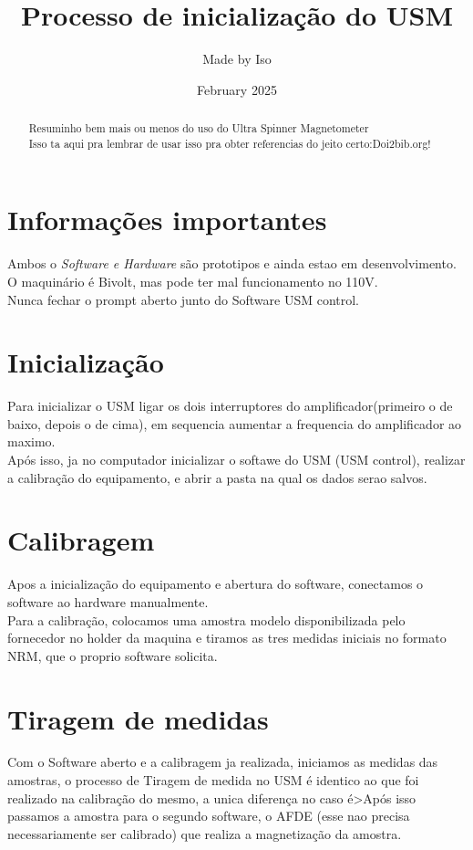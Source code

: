 \documentclass[twocolumn]{paper}
\title{Processo de inicialização do USM}
\author{Made by Iso }
\date{February 2025}
\begin{document}
\maketitle

\begin{abstract}
  Resuminho bem mais ou menos do uso do Ultra Spinner Magnetometer\\
  Isso ta aqui pra lembrar de usar isso pra obter referencias do jeito certo:Doi2bib.org!
\end{abstract}

\section{Informações importantes}
Ambos o \emph{Software e Hardware} são prototipos e ainda estao em desenvolvimento.\\
O maquinário é Bivolt, mas pode ter mal funcionamento no 110V.\\
Nunca fechar o prompt aberto junto do Software USM control.\\

\section{Inicialização}
Para inicializar o USM ligar os dois interruptores do amplificador(primeiro o de baixo, depois o de cima), em sequencia aumentar a frequencia do amplificador ao maximo.\\
Após isso, ja no computador inicializar o softawe do USM (USM control), realizar a calibração do equipamento, e abrir a pasta na qual os dados serao salvos.

\section{Calibragem}
Apos a inicialização do equipamento e abertura do software, conectamos o software ao hardware manualmente.\\
Para a calibração, colocamos uma amostra modelo disponibilizada pelo fornecedor no holder da maquina e tiramos as tres medidas iniciais no formato NRM, que o proprio software solicita.

\section{Tiragem de medidas}
Com o Software aberto e a calibragem ja realizada, iniciamos as medidas das amostras, o processo de Tiragem de medida no USM é identico ao que foi realizado na calibração do mesmo, a unica diferença no caso é>Após isso passamos a amostra para o segundo software, o AFDE (esse nao precisa necessariamente ser calibrado) que realiza a magnetização da amostra.
\end{document}
